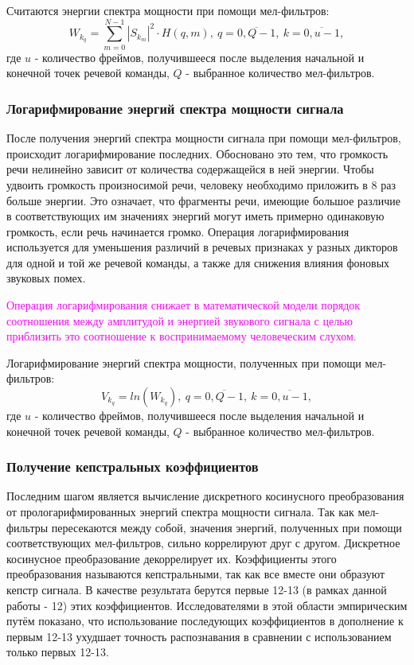 Считаются энергии спектра мощности при помощи мел-фильтров:
\begin{equation}
	W_{k_q} = \sum_{m=0}^{N-1} |S_{k_m}|^2 \cdot H(q,m),~q=\overline{0,Q-1},~k=\overline{0,u-1},
\end{equation}
где $u$ - количество фреймов, получившееся после выделения начальной и конечной точек речевой команды, $Q$ - выбранное количество мел-фильтров.

\subsubsection{Логарифмирование энергий спектра мощности сигнала}
После получения энергий спектра мощности сигнала при помощи мел-фильтров, происходит логарифмирование последних. Обосновано это тем, что громкость речи нелинейно зависит от количества содержащейся в ней энергии. Чтобы удвоить громкость произносимой речи, человеку необходимо приложить в 8 раз больше энергии. Это означает, что фрагменты речи, имеющие большое различие в соответствующих им значениях энергий могут иметь примерно одинаковую громкость, если речь начинается громко. Операция логарифмирования используется
для уменьшения различий в речевых признаках у разных дикторов для одной и той же речевой команды, а также для снижения влияния фоновых звуковых помех.

\textcolor{magenta}{Операция логарифмирования снижает в математической модели порядок соотношения между амплитудой и энергией звукового сигнала с целью приблизить это соотношение к воспринимаемому человеческим слухом.}

Логарифмирование энергий спектра мощности, полученных при помощи мел-фильтров:
\begin{equation}
	V_{k_q} = ln(W_{k_q}),~q=\overline{0,Q-1},~k=\overline{0,u-1},
\end{equation}
где $u$ - количество фреймов, получившееся после выделения начальной и конечной точек речевой команды, $Q$ - выбранное количество мел-фильтров.

\subsubsection{Получение кепстральных коэффициентов}
Последним шагом является вычисление дискретного косинусного преобразования от прологарифмированных энергий спектра мощности сигнала. Так как мел-фильтры пересекаются между собой, значения энергий, полученных при помощи соответствующих мел-фильтров, сильно коррелируют друг с другом. Дискретное косинусное преобразование декоррелирует их. Коэффициенты этого преобразования называются кепстральными, так как все вместе они образуют кепстр сигнала. В качестве результата берутся первые 12-13 (в рамках данной работы - 12) этих коэффициентов. Исследователями в этой области эмпирическим путём показано, что использование последующих коэффициентов в дополнение к первым 12-13 ухудшает точность распознавания в сравнении с использованием только первых 12-13.

